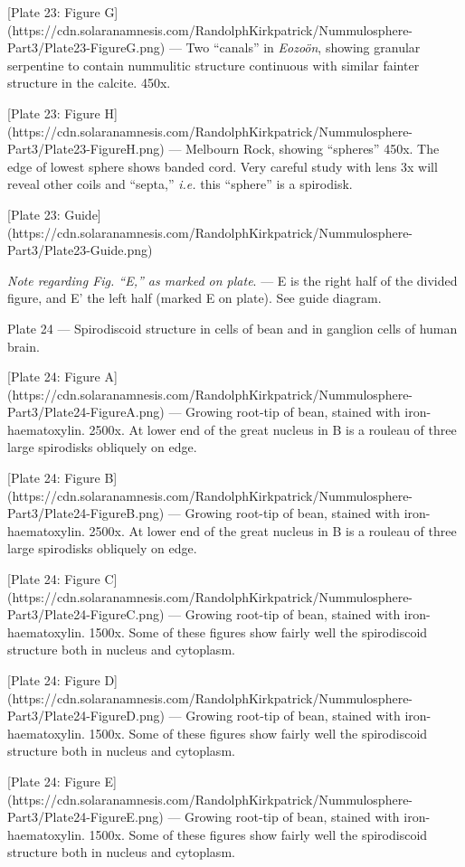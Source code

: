 \documentclass[a4paper, 12pt, oneside]{article}
\begin{document}
[Plate 23: Figure G](https://cdn.solaranamnesis.com/RandolphKirkpatrick/Nummulosphere-Part3/Plate23-FigureG.png) --- Two ``canals'' in \emph{Eozoön}, showing granular serpentine to contain nummulitic structure continuous with similar fainter structure in the calcite. 450x.

[Plate 23: Figure H](https://cdn.solaranamnesis.com/RandolphKirkpatrick/Nummulosphere-Part3/Plate23-FigureH.png) --- Melbourn Rock, showing ``spheres'' 450x. The edge of lowest sphere shows banded cord. Very careful study with lens 3x will reveal other coils and ``septa,'' \emph{i.e.} this ``sphere'' is a spirodisk.

[Plate 23: Guide](https://cdn.solaranamnesis.com/RandolphKirkpatrick/Nummulosphere-Part3/Plate23-Guide.png)

\emph{Note regarding Fig. ``E,'' as marked on plate}. --- E is the right half of the divided figure, and E' the left half (marked E on plate). See guide diagram.

Plate 24 --- Spirodiscoid structure in cells of bean and in ganglion cells of human brain.

[Plate 24: Figure A](https://cdn.solaranamnesis.com/RandolphKirkpatrick/Nummulosphere-Part3/Plate24-FigureA.png) --- Growing root-tip of bean, stained with iron-haematoxylin. 2500x. At lower end of the great nucleus in B is a rouleau of three large spirodisks obliquely on edge.

[Plate 24: Figure B](https://cdn.solaranamnesis.com/RandolphKirkpatrick/Nummulosphere-Part3/Plate24-FigureB.png) --- Growing root-tip of bean, stained with iron-haematoxylin. 2500x. At lower end of the great nucleus in B is a rouleau of three large spirodisks obliquely on edge.

[Plate 24: Figure C](https://cdn.solaranamnesis.com/RandolphKirkpatrick/Nummulosphere-Part3/Plate24-FigureC.png) --- Growing root-tip of bean, stained with iron-haematoxylin. 1500x. Some of these figures show fairly well the spirodiscoid structure both in nucleus and cytoplasm.

[Plate 24: Figure D](https://cdn.solaranamnesis.com/RandolphKirkpatrick/Nummulosphere-Part3/Plate24-FigureD.png) --- Growing root-tip of bean, stained with iron-haematoxylin. 1500x. Some of these figures show fairly well the spirodiscoid structure both in nucleus and cytoplasm.

[Plate 24: Figure E](https://cdn.solaranamnesis.com/RandolphKirkpatrick/Nummulosphere-Part3/Plate24-FigureE.png) --- Growing root-tip of bean, stained with iron-haematoxylin. 1500x. Some of these figures show fairly well the spirodiscoid structure both in nucleus and cytoplasm.
\end{document}
